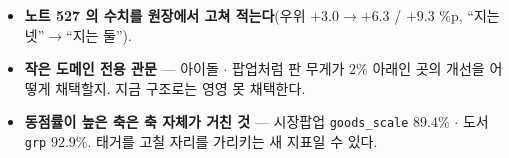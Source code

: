 \documentclass[11pt]{article}
\begin{document}
\begin{itemize}
\item \textbf{노트 527 의 수치를 원장에서 고쳐 적는다}(우위 $+3.0 \to +6.3$ /
$+9.3$ \%p, ``지는 넷''$\to$``지는 둘'').
\item \textbf{작은 도메인 전용 관문} --- 아이돌 $\cdot$ 팝업처럼 판 무게가
$2\%$ 아래인 곳의 개선을 어떻게 채택할지. 지금 구조로는 영영 못 채택한다.
\item \textbf{동점률이 높은 축은 축 자체가 거친 것} --- 시장팝업
\texttt{goods\_scale} $89.4\%$ $\cdot$ 도서 \texttt{grp} $92.9\%$.
태거를 고칠 자리를 가리키는 새 지표일 수 있다.
\end{itemize}
\end{document}
